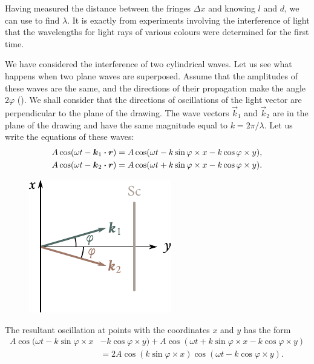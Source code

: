 Having measured the distance between the fringes $\Delta{x}$ and knowing $l$ and $d$, we can use  to find $\lambda$.
It is exactly from experiments involving the interference of light that the wavelengths for light rays of various colours were determined for the first time.

We have considered the interference of two cylindrical waves.
Let us see what happens when two plane waves are superposed.
Assume that the amplitudes of these waves are the same, and the directions of their propagation make the angle $2\varphi$ ().
We shall consider that the directions of oscillations of the light vector are perpendicular to the plane of the drawing.
The wave vectors $\vec{k}_1$ and $\vec{k}_2$ are in the plane of the drawing and have the same magnitude equal to $k=2\pi/\lambda$.
Let us write the equations of these waves:
\begin{align*}
    A \cos(\omega t - \boldsymbol{k}_1\boldsymbol{\cdot}\boldsymbol{r}) & = A \cos(\omega t - k \sin\varphi \times x - k \cos\varphi \times y),\\
    A \cos(\omega t - \boldsymbol{k}_2\boldsymbol{\cdot}\boldsymbol{r}) & = A \cos(\omega t + k \sin\varphi \times x - k \cos\varphi \times y).
\end{align*}

\begin{figure}[t]
	\begin{center}
		\includegraphics[scale=1]{figures/ch_17/fig_17_3.pdf}
		\caption[]{}
		\label{fig:17_3}
	\end{center}
	\vspace{-0.9cm}
\end{figure}

The resultant oscillation at points with the coordinates $x$ and $y$ has the form
\begin{align}
    A \cos(\omega t - k \sin\varphi \times x &- k \cos\varphi \times y) + A \cos(\omega t + k \sin\varphi \times x - k \cos\varphi \times y)\nonumber\\
    & = 2A \cos(k \sin\varphi \times x) \cos(\omega t - k \cos\varphi \times y). \label{eq:17_11}
\end{align}

